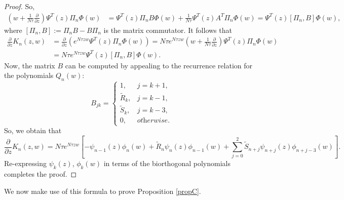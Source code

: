 \documentclass[usenames,dvipsnames]{article}
\theoremstyle{definition}
\numberwithin{equation}{section}
\numberwithin{figure}{section}
\begin{document}
\begin{proof}
So,
    \begin{align*}
        \left(w+\frac{1}{N\tau}\frac{\partial}{\partial z}\right)\Psi^T(z)\Pi_n\Phi(w) &= \Psi^T(z)\Pi_n B\Phi(w) + \frac{1}{N\tau}\Psi^T(z)A^T\Pi_n\Phi(w) = \Psi^T(z)\left[\Pi_n,B\right]\Phi(w),
    \end{align*}
where $\left[\Pi_n,B\right] := \Pi_n B - B \Pi_n$ is the matrix commutator. It follows that
    \begin{align*}
        \frac{\partial}{\partial z} K_n(z,w) &= \frac{\partial}{\partial z}\left(e^{N\tau zw} \Psi^T(z)\Pi_n \Phi(w)\right) = N\tau e^{N\tau zw}\left(w + \frac{1}{N\tau}\frac{\partial}{\partial z}\right)\Psi^T(z)\Pi_n \Phi(w)\\
        &= N\tau e^{N\tau zw}\Psi^T(z)\left[\Pi_n,B\right]\Phi(w).
    \end{align*}
Now, the matrix $B$ can be computed by appealing to the recurrence relation for the polynomials $Q_n(w)$:
    \begin{equation}
        B_{jk} = 
        \begin{cases}
            1, & j = k+1,\\
            \tilde{R}_k, & j = k-1,\\
            \tilde{S}_k, & j = k-3,\\
            0, & \textit{otherwise}.
        \end{cases}
    \end{equation}
So, we obtain that
    \begin{equation*}
        \frac{\partial}{\partial z}K_n(z,w) = N\tau e^{N\tau zw}\left[-\psi_{n-1}(z)\phi_n(w) + \tilde{R}_n\psi_n(z)\phi_{n-1}(w) + \sum_{j=0}^{2}\tilde{S}_{n+j} \psi_{n+j}(z)\phi_{n+j-3}(w)\right].
    \end{equation*}
Re-expressing $\psi_k(z)$, $\phi_k(w)$ in terms of the biorthogonal polynomials completes the proof.
\end{proof}

We now make use of this formula to prove Proposition \ref{propC}.
\end{document}
